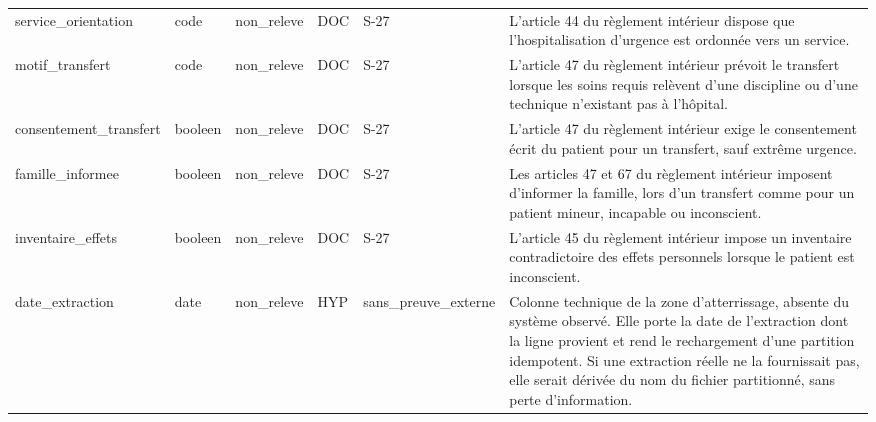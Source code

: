 \begin{longtable}{p{2.5cm}p{1.8cm}p{2.8cm}p{1.3cm}p{2.2cm}p{5cm}}
service\_orientation & code & non\_releve & DOC & S-27 & L'article 44 du règlement intérieur dispose que l'hospitalisation d'urgence est ordonnée vers un service. \\
motif\_transfert & code & non\_releve & DOC & S-27 & L'article 47 du règlement intérieur prévoit le transfert lorsque les soins requis relèvent d'une discipline ou d'une technique n'existant pas à l'hôpital. \\
consentement\_transfert & booleen & non\_releve & DOC & S-27 & L'article 47 du règlement intérieur exige le consentement écrit du patient pour un transfert, sauf extrême urgence. \\
famille\_informee & booleen & non\_releve & DOC & S-27 & Les articles 47 et 67 du règlement intérieur imposent d'informer la famille, lors d'un transfert comme pour un patient mineur, incapable ou inconscient. \\
inventaire\_effets & booleen & non\_releve & DOC & S-27 & L'article 45 du règlement intérieur impose un inventaire contradictoire des effets personnels lorsque le patient est inconscient. \\
date\_extraction & date & non\_releve & HYP & sans\_preuve\_externe & Colonne technique de la zone d'atterrissage, absente du système observé. Elle porte la date de l'extraction dont la ligne provient et rend le rechargement d'une partition idempotent. Si une extraction réelle ne la fournissait pas, elle serait dérivée du nom du fichier partitionné, sans perte d'information. \\
\hline
\end{longtable}

